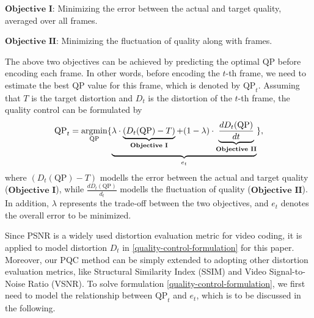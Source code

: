\documentclass[smallabstract,smallcaptions]{dccpaper}
\begin{document}
$\textbf{Objective I}$: Minimizing the error between the actual and target quality, averaged over all frames.

$\textbf{Objective II}$: Minimizing the fluctuation of quality along with frames.

The above two objectives can be achieved by predicting the optimal $\mathrm{QP}$ before encoding each frame. In other words, before encoding the $t$-th frame, we need to estimate the best $\mathrm{QP}$ value for this frame, which is denoted by $\mathrm{QP}_{t}$. Assuming that $T$ is the target distortion and $D_t$ is the distortion of the $t$-th frame, the quality control can be formulated by
\vspace{-0.7em}
\begin{equation}
\label{quality-control-formulation}
\mathrm{QP}_{t}=\argmin_{\mathrm{QP}} \lbrace \underbrace{\lambda \cdot \underbrace{(D_{t}(\mathrm{QP})-T)}_{\textbf{Objective I}}+(1-\lambda) \cdot \underbrace{\dfrac{dD_{t}(\mathrm{QP})}{dt}}_{\textbf{Objective II}}}_{e_t} \rbrace,
\vspace{-0.7em}
\end{equation}
where $(D_{t}(\mathrm{QP})-T)$ modells the error between the actual and target quality ($\textbf{Objective I}$), while $\frac{dD_{t}(\mathrm{QP})}{d_t}$ modells the fluctuation of quality ($\textbf{Objective II}$). In addition, $\lambda$ represents the trade-off between the two objectives, and $e_t$ denotes the overall error to be minimized.

Since PSNR is a widely used distortion evaluation metric for video coding, it is applied to model distortion $D_t$ in \eqref{quality-control-formulation} for this paper. Moreover, our PQC method can be simply extended to adopting other distortion evaluation metrics, like Structural Similarity Index (SSIM) and Video Signal-to-Noise Ratio (VSNR). To solve formulation \eqref{quality-control-formulation}, we first need to model the relationship between $\mathrm{QP}_{t}$ and $e_t$, which is to be discussed in the following.
\vspace{-1.0em}
\end{document}
